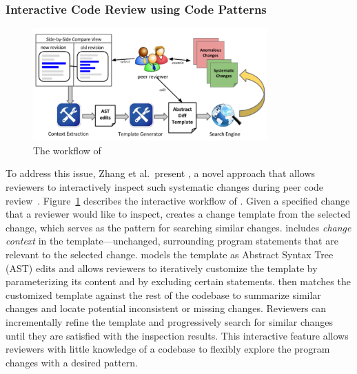 \documentclass[runningheads,a4paper]{llncs}
\begin{document}
\subsubsection{Interactive Code Review using Code Patterns} 
\begin{figure}[ht]
 \centering
 \includegraphics[width=0.8\textwidth]{images/critics-workflow.pdf}
 \caption{The workflow of {\critics}}
 \label{fig:critics-workflow}
\end{figure}

To address this issue, Zhang et al.~present {\critics}, a novel approach that allows reviewers to interactively inspect such systematic changes during peer code review~\cite{zhang2015interactive}. Figure~\ref{fig:critics-workflow} describes the interactive workflow of {\critics}. Given a specified change that a reviewer would like to inspect, {\critics} creates a change template from the selected change, which serves as the pattern for searching similar changes. {\critics} includes {\em change context} in the template---unchanged, surrounding program statements that are relevant to the selected change. {\critics} models the template as Abstract Syntax Tree (AST) edits and allows reviewers to iteratively customize the template by parameterizing its content and by excluding certain statements. {\critics} then matches the customized template against the rest of the codebase to summarize similar changes and locate potential inconsistent or missing changes. Reviewers can incrementally refine the template and progressively search for similar changes until they are satisfied with the inspection results. This interactive feature allows reviewers with little knowledge of a codebase to flexibly explore the program changes with a desired pattern.
\end{document}
